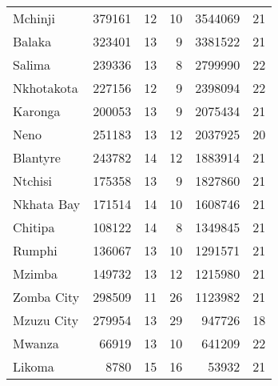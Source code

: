 \begin{tabular}{lrrrrr}
Mchinji       &      379161 &          12 &           10 &          3544069 &          21 \\
Balaka        &      323401 &          13 &            9 &          3381522 &          21 \\
Salima        &      239336 &          13 &            8 &          2799990 &          22 \\
Nkhotakota    &      227156 &          12 &            9 &          2398094 &          22 \\
Karonga       &      200053 &          13 &            9 &          2075434 &          21 \\
Neno          &      251183 &          13 &           12 &          2037925 &          20 \\
Blantyre      &      243782 &          14 &           12 &          1883914 &          21 \\
Ntchisi       &      175358 &          13 &            9 &          1827860 &          21 \\
Nkhata Bay    &      171514 &          14 &           10 &          1608746 &          21 \\
Chitipa       &      108122 &          14 &            8 &          1349845 &          21 \\
Rumphi        &      136067 &          13 &           10 &          1291571 &          21 \\
Mzimba        &      149732 &          13 &           12 &          1215980 &          21 \\
Zomba City    &      298509 &          11 &           26 &          1123982 &          21 \\
Mzuzu City    &      279954 &          13 &           29 &           947726 &          18 \\
Mwanza        &       66919 &          13 &           10 &           641209 &          22 \\
Likoma        &        8780 &          15 &           16 &            53932 &          21 \\
\bottomrule
\end{tabular}
